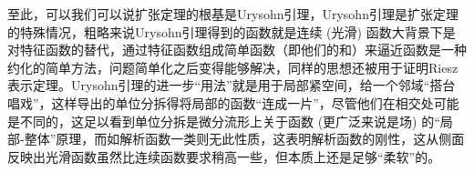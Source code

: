 \documentclass[options]{article}
\begin{document}
至此，可以我们可以说扩张定理的根基是Urysohn引理，Urysohn引理是扩张定理的特殊情况，粗略来说Urysohn引理得到的函数就是连续 (光滑) 函数大背景下是对特征函数的替代，通过特征函数组成简单函数（即他们的和）来逼近函数是一种约化的简单方法，问题简单化之后变得能够解决，同样的思想还被用于证明Riesz表示定理。Urysohn引理的进一步“用法”就是用于局部紧空间，给一个邻域“搭台唱戏”，这样导出的单位分拆得将局部的函数“连成一片”，尽管他们在相交处可能是不同的，这足以看到单位分拆是微分流形上关于函数 (更广泛来说是场) 的“局部-整体”原理，而如解析函数一类则无此性质，这表明解析函数的刚性，这从侧面反映出光滑函数虽然比连续函数要求稍高一些，但本质上还是足够“柔软”的。
\end{document}
